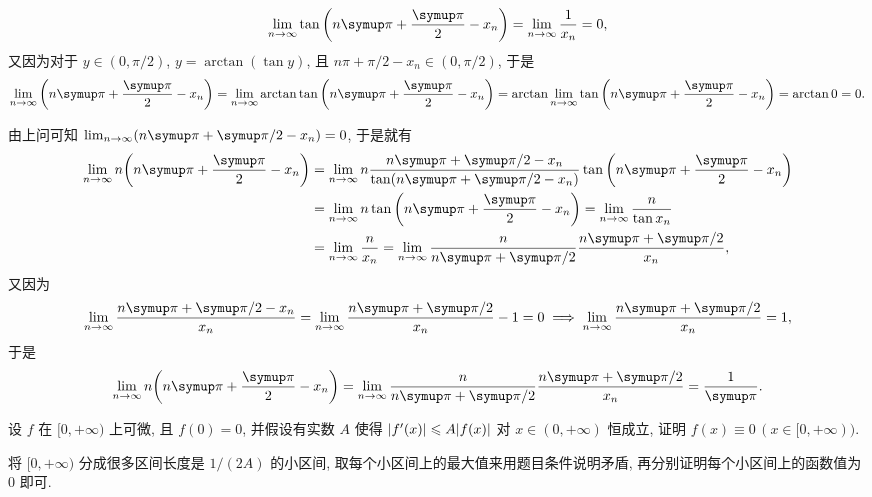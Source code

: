 \begin{exercise}[series=exer]
\begin{answer}
\begin{answersheet}
\begin{align*}
                \limit{n}{\infty}\tan\qty(n \pi + \frac{\pi}{2} - x_{n}) = \limit{n}{\infty}\frac{1}{x_{n}} = 0,
            \end{align*}
            又因为对于 $ y \in (0, \pi/2) $, $ y = \arctan(\tan y) $, 且 $ n\pi + \pi/2 - x_{n} \in (0, \pi/2) $, 于是
            \begin{align*}
                \limit{n}{\infty}\qty(n \pi + \frac{\pi}{2} - x_{n}) = \limit{n}{\infty} \arctan\tan\qty(n \pi + \frac{\pi}{2} - x_{n}) = \arctan \limit{n}{\infty} \tan\qty(n \pi + \frac{\pi}{2} - x_{n}) = \arctan 0 = 0.
            \end{align*}
            \item 由上问可知 $ \limit{n}{\infty}(n\pi + \pi/2 - x_{n}) = 0 $, 于是就有
            \begin{align*}
                \limit{n}{\infty} n\qty(n\pi + \frac{\pi}{2} - x_{n}) & = \limit{n}{\infty} n \frac{n\pi + \pi/2 - x_{n}}{\tan(n\pi + \pi/2 - x_{n})}\tan\qty(n\pi + \frac{\pi}{2} - x_{n})\\
                & = \limit{n}{\infty} n \tan\qty(n\pi + \frac{\pi}{2} - x_{n}) = \limit{n}{\infty} \frac{n}{\tan x_{n}} \\
                & = \limit{n}{\infty} \frac{n}{x_{n}} = \limit{n}{\infty} \frac{n}{n \pi + \pi/2} \frac{n \pi + \pi/2}{x_{n}},
            \end{align*}
            又因为
            \begin{align*}
                \limit{n}{\infty} \frac{n\pi + \pi/2 - x_{n}}{x_{n}} = \limit{n}{\infty} \frac{n \pi + \pi/2}{x_{n}} - 1 = 0 \implies \limit{n}{\infty} \frac{n\pi + \pi/2}{x_{n}} = 1,
            \end{align*}
            于是
            \begin{align*}
                \limit{n}{\infty} n\qty(n\pi + \frac{\pi}{2} - x_{n}) = \limit{n}{\infty} \frac{n}{n \pi + \pi/2} \frac{n \pi + \pi/2}{x_{n}} = \frac{1}{\pi}.
            \end{align*}
        \end{answersheet}
    \end{answer}
    \item 设 $ f $ 在 $ [0, +\infty) $ 上可微, 且 $ f(0) = 0 $, 并假设有实数 $ A $ 使得 $ \abs{f'(x)} \leqslant A\abs{f(x)} $ 对 $ x \in (0, +\infty) $ 恒成立, 证明 $ f(x) \equiv 0\,(x \in [0, +\infty)) $.
    \begin{hint}
        将 $ [0, +\infty) $ 分成很多区间长度是 $ 1/(2A) $ 的小区间, 取每个小区间上的最大值来用题目条件说明矛盾, 再分别证明每个小区间上的函数值为 $ 0 $ 即可.

\end{hint}
\end{exercise}
